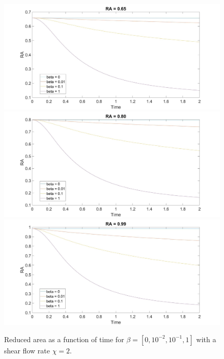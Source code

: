 \documentclass[aps,prl,showpacs]{revtex4}
\begin{document}
\begin{figure}
	\centering
	\includegraphics[width=.9\textwidth]{figures/10.jpg}
	\includegraphics[width=.9\textwidth]{figures/11.jpg}
	\includegraphics[width=.9\textwidth]{figures/12.jpg}
	\caption{Reduced area as a function of time for $\beta = [0, 10^{-2},10^{-1}, 1]$ with a shear flow rate $\chi = 2$.}
	\label{Shear0}
\end{figure}
 
\end{document}
